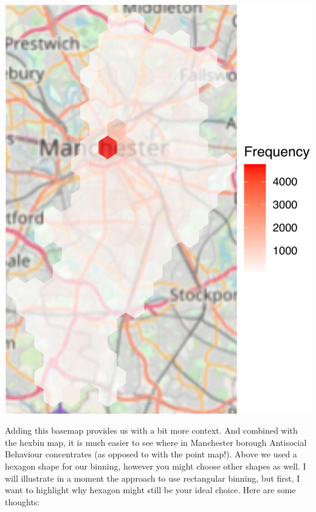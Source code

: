 \documentclass[
  krantz2]{krantz}
\begin{document}
\includegraphics{crime_mapping_files/figure-latex/unnamed-chunk-126-1.pdf}

Adding this basemap provides us with a bit more context. And combined with the hexbin map, it is much easier to see where in Manchester borough Antisocial Behaviour concentrates (as opposed to with the point map!). Above we used a hexagon shape for our binning, however you might choose other shapes as well. I will illustrate in a moment the approach to use rectangular binning, but first, I want to highlight why hexagon might still be your ideal choice. Here are some thoughts:
\end{document}
